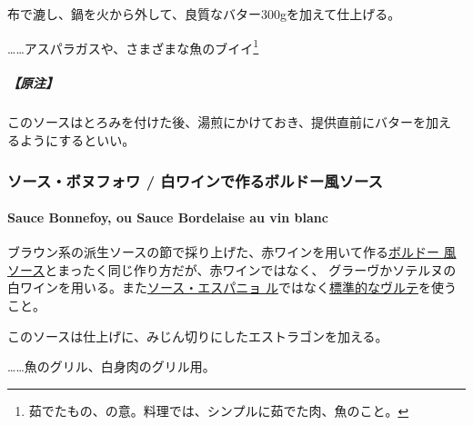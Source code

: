 \begin{recette}
布で漉し、鍋を火から外して、良質なバター300gを加えて仕上げる。

\ldots{}\ldots{}アスパラガスや、さまざまな魚のブイイ\footnote{茹でたもの、の意。料理では、シンプルに茹でた肉、魚のこと。}

\hypertarget{ux539fux6ce8-1}{%
\subparagraph{【原注】}\label{ux539fux6ce8-1}}

このソースはとろみを付けた後、湯煎にかけておき、提供直前にバターを加え
るようにするといい。

\maeaki

\hypertarget{ux30bdux30fcux30b9ux30dcux30ccux30d5ux30a9ux30ef-ux767dux30efux30a4ux30f3ux3067ux4f5cux308bux30dcux30ebux30c9ux30fcux98a8ux30bdux30fcux30b9}{%
\subsubsection{ソース・ボヌフォワ /
白ワインで作るボルドー風ソース}\label{ux30bdux30fcux30b9ux30dcux30ccux30d5ux30a9ux30ef-ux767dux30efux30a4ux30f3ux3067ux4f5cux308bux30dcux30ebux30c9ux30fcux98a8ux30bdux30fcux30b9}}

\hypertarget{sauce-bonnefoy}{%
\paragraph{Sauce Bonnefoy, ou Sauce Bordelaise au vin
blanc}\label{sauce-bonnefoy}}


ブラウン系の派生ソースの節で採り上げた、赤ワインを用いて作る\protect\hyperlink{sauce-bordelaise}{ボルドー
風ソース}とまったく同じ作り方だが、赤ワインではなく、
グラーヴかソテルヌの白ワインを用いる。また\protect\hyperlink{sauce-espagnole}{ソース・エスパニョ
ル}ではなく\protect\hyperlink{veloute}{標準的なヴルテ}を使うこと。

このソースは仕上げに、みじん切りにしたエストラゴンを加える。

\ldots{}\ldots{}魚のグリル、白身肉のグリル用。

\maeaki

\hypertarget{ux30d6ux30ebux30bfux30fcux30cbux30e5ux98a8ux30bdux30fcux30b9}{%
}
\end{recette}

